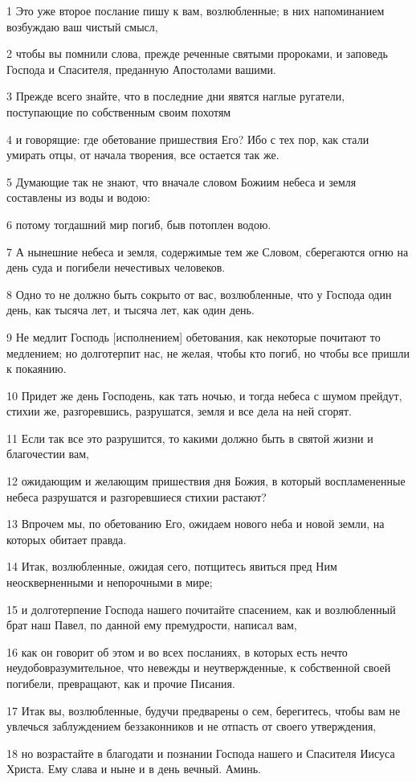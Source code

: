\par 1 Это уже второе послание пишу к вам, возлюбленные; в них напоминанием возбуждаю ваш чистый смысл,
\par 2 чтобы вы помнили слова, прежде реченные святыми пророками, и заповедь Господа и Спасителя, преданную Апостолами вашими.
\par 3 Прежде всего знайте, что в последние дни явятся наглые ругатели, поступающие по собственным своим похотям
\par 4 и говорящие: где обетование пришествия Его? Ибо с тех пор, как стали умирать отцы, от начала творения, все остается так же.
\par 5 Думающие так не знают, что вначале словом Божиим небеса и земля составлены из воды и водою:
\par 6 потому тогдашний мир погиб, быв потоплен водою.
\par 7 А нынешние небеса и земля, содержимые тем же Словом, сберегаются огню на день суда и погибели нечестивых человеков.
\par 8 Одно то не должно быть сокрыто от вас, возлюбленные, что у Господа один день, как тысяча лет, и тысяча лет, как один день.
\par 9 Не медлит Господь [исполнением] обетования, как некоторые почитают то медлением; но долготерпит нас, не желая, чтобы кто погиб, но чтобы все пришли к покаянию.
\par 10 Придет же день Господень, как тать ночью, и тогда небеса с шумом прейдут, стихии же, разгоревшись, разрушатся, земля и все дела на ней сгорят.
\par 11 Если так все это разрушится, то какими должно быть в святой жизни и благочестии вам,
\par 12 ожидающим и желающим пришествия дня Божия, в который воспламененные небеса разрушатся и разгоревшиеся стихии растают?
\par 13 Впрочем мы, по обетованию Его, ожидаем нового неба и новой земли, на которых обитает правда.
\par 14 Итак, возлюбленные, ожидая сего, потщитесь явиться пред Ним неоскверненными и непорочными в мире;
\par 15 и долготерпение Господа нашего почитайте спасением, как и возлюбленный брат наш Павел, по данной ему премудрости, написал вам,
\par 16 как он говорит об этом и во всех посланиях, в которых есть нечто неудобовразумительное, что невежды и неутвержденные, к собственной своей погибели, превращают, как и прочие Писания.
\par 17 Итак вы, возлюбленные, будучи предварены о сем, берегитесь, чтобы вам не увлечься заблуждением беззаконников и не отпасть от своего утверждения,
\par 18 но возрастайте в благодати и познании Господа нашего и Спасителя Иисуса Христа. Ему слава и ныне и в день вечный. Аминь.


